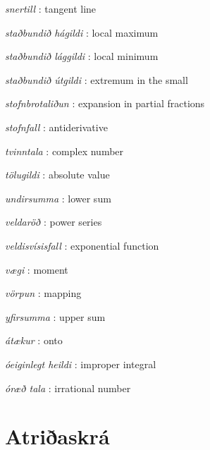 \documentclass[a4paper,10pt,icelandic]{sphinxmanual}
\begin{document}
\emph{snertill} : tangent line

\emph{staðbundið hágildi} : local maximum

\emph{staðbundið lággildi} : local minimum

\emph{staðbundið útgildi} : extremum in the small

\emph{stofnbrotaliðun} : expansion in partial fractions

\emph{stofnfall} : antiderivative

\emph{tvinntala} : complex number


\emph{tölugildi} : absolute value

\emph{undirsumma} : lower sum


\emph{veldaröð} : power series


\emph{veldisvísisfall} : exponential function


\emph{vægi} : moment

\emph{vörpun} : mapping

\emph{yfirsumma} : upper sum


\emph{átækur} : onto

\emph{óeiginlegt heildi} : improper integral


\emph{óræð tala} : irrational number


\chapter{Atriðaskrá}
\printindex
\end{document}
